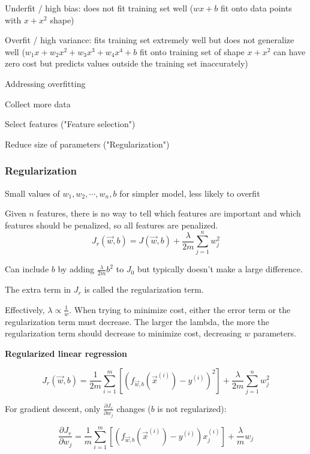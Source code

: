 \documentclass[12pt]{article}
\begin{document}
Underfit / high bias: does not fit training set well ($wx + b$ fit onto data points with $x + x^2$ shape)

Overfit / high variance: fits training set extremely well but does not generalize well ($w_1 x + w_2 x^2 + w_3 x^3 + w_4 x^4 + b$ fit onto training set of shape $x + x^2$ can have zero cost but predicts values outside the training set inaccurately)

\vspace{5px}

Addressing overfitting
\begin{myitemize}
	\item Collect more data
	\item Select features ("Feature selection")
	\item Reduce size of parameters ("Regularization")
\end{myitemize}

\subsubsection{Regularization}

Small values of $w_1,w_2,\cdots,w_n,b$ for simpler model, less likely to overfit

Given $n$ features, there is no way to tell which features are important and which features should be penalized, so all features are penalized.
\[ J_r(\vec{w},b) = J(\vec{w},b) + \frac{\lambda}{2m} \sum_{j=1}^n w_j^2 \]

Can include $b$ by adding $\frac{\lambda}{2m} b^2$ to $J_0$ but typically doesn't make a large difference.

The extra term in $J_r$ is called the regularization term.

Effectively, $\lambda \propto \frac{1}{w}$. When trying to minimize cost, either the error term or the regularization term must decrease. The larger the lambda, the more the regularization term should decrease to minimize cost, decreasing $w$ parameters.

\noindent \textbf{Regularized linear regression}

\[ J_r(\vec{w},b) = \frac{1}{2m} \sum_{i=1}^m \left[(f_{\vec{w},b}(\vec{x}^{(i)}) - y^{(i)})^2\right] + \frac{\lambda}{2m} \sum_{j=1}^n w_j^2 \]

For gradient descent, only $\frac{\partial J_r}{\partial w_j}$ changes ($b$ is not regularized):

\[ \frac{\partial J_r}{\partial w_j} = \frac{1}{m} \sum_{i=1}^m \left[(f_{\vec{w},b}(\vec{x}^{(i)}) - y^{(i)})x_j^{(i)}\right] + \frac{\lambda}{m} w_j \]
\end{document}
